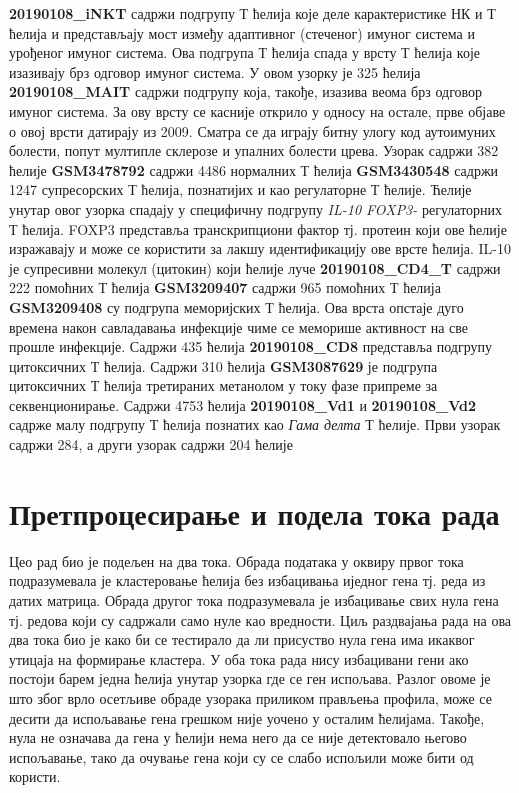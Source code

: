 \documentclass[10pt, a4paper]{article}
\begin{document}
\begin{itemize}
\begin{itemize}
 \textbf{20190108\_iNKT} садржи подгрупу Т ћелија које деле карактеристике НК и Т ћелија и представљају мост између адаптивног (стеченог) имуног система и урођеног имуног система. Ова подгрупа Т ћелија спада у врсту Т ћелија које изазивају брз одговор имуног система. У овом узорку је 325 ћелија
 \textbf{20190108\_MAIT} садржи подгрупу која, такође, изазива веома брз одговор имуног система. За ову врсту се касније открило у односу на остале, прве објаве о овој врсти датирају из 2009. Сматра се да играју битну улогу код аутоимуних болести, попут мултипле склерозе и упалних болести црева. Узорак садржи 382 ћелије
 \textbf{GSM3478792} садржи 4486 нормалних Т ћелија
 \textbf{GSM3430548} садржи 1247 супресорских Т ћелија, познатијих и као регулаторне Т ћелије. Ћелије унутар овог узорка спадају у специфичну подгрупу {\em IL-10 FOXP3-} регулаторних Т ћелија. FOXP3 представља транскрипциони фактор тј. протеин који ове ћелије изражавају и може се користити за лакшу идентификацију ове врсте ћелија. IL-10 је супресивни молекул (цитокин) који ћелије луче
 \textbf{20190108\_CD4\_T} садржи 222 помоћних Т ћелија
 \textbf{GSM3209407} садржи 965 помоћних Т ћелија
 \textbf{GSM3209408} су подгрупа меморијских Т ћелија. Ова врста опстаје дуго времена након савладавања инфекције чиме се меморише активност на све прошле инфекције. Садржи 435 ћелија
 \textbf{20190108\_CD8} представља подгрупу цитоксичних Т ћелија. Садржи 310 ћелија
 \textbf{GSM3087629} је подгрупа цитоксичних Т ћелија третираних метанолом у току фазе припреме за секвенционирање. Садржи 4753 ћелија
 \textbf{20190108\_Vd1} и \textbf{20190108\_Vd2} садрже малу подгрупу Т ћелија познатих као {\em Гама делта} Т ћелије. Први узорак садржи 284, а други узорак садржи 204 ћелије
\end{itemize}
\end{itemize}

\section{Претпроцесирање и подела тока рада}
\label{subsec: podnaslov2}
Цео рад био је подељен на два тока. Обрада података у оквиру првог тока подразумевала је кластеровање ћелија без избацивања иједног гена тј. реда из датих матрица. Обрада другог тока подразумевала је избацивање свих нула гена тј. редова који су садржали само нуле као вредности. Циљ раздвајања рада на ова два тока био је како би се тестирало да ли присуство нула гена има икаквог утицаја на формирање кластера. У оба тока рада нису избацивани гени ако постоји барем једна ћелија унутар узорка где се ген испољава. Разлог овоме је што због врло осетљиве обраде узорака приликом прављења профила, може се десити да испољавање гена грешком није уочено у осталим ћелијама. Такође, нула не означава да гена у ћелији нема него да се није детектовало његово испољавање, тако да очување гена који су се слабо испољили може бити од користи.
\end{document}

